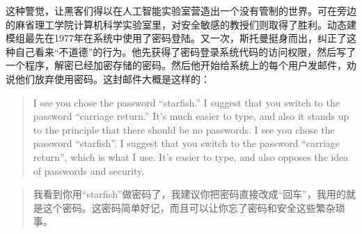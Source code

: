 \ifdefined\chs
这种警觉，让黑客们得以在人工智能实验室营造出一个没有管制的世界。可在旁边的麻省理工学院计算机科学实验室里，对安全敏感的教授们则取得了胜利。动态建模组最先在1977年在系统中使用了密码登陆。又一次，斯托曼挺身而出，纠正了这种自己看来``不道德''的行为。他先获得了密码登录系统代码的访问权限，然后写了一个程序，解密已经加密存储的密码。然后他开始给系统上的每个用户发邮件，劝说他们放弃使用密码。这封邮件大概是这样的：
\fi

\ifdefined\eng
\begin{quote}
\ifdefined\vone
I see you chose the password ``starfish.'' I suggest that you switch to the password ``carriage return.'' It's much easier to type, and also it stands up to the principle that there should be no passwords.
\fi
\ifdefined\vtwo
I see you chose the password ``starfish''. I suggest that you switch to the password ``carriage return'', which is what I use. It's easier to type, and also opposes the idea of passwords and security.
\fi
\end{quote}
\fi

\ifdefined\chs
\begin{quote}
我看到你用``starfish''做密码了，我建议你把密码直接改成``回车''，我用的就是这个密码。这密码简单好记，而且可以让你忘了密码和安全这些繁杂琐事。
\end{quote}
\fi

